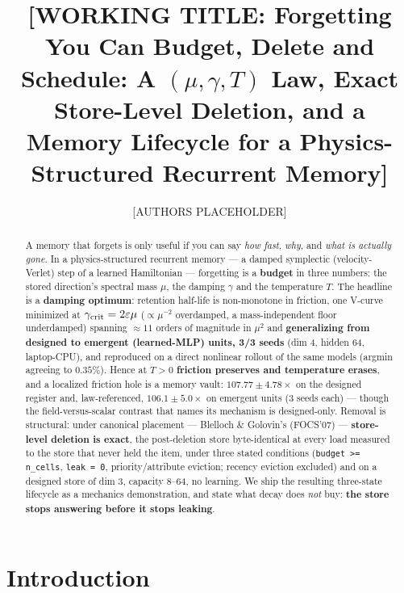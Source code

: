 \documentclass{article}
\title{[WORKING TITLE: Forgetting You Can Budget, Delete and Schedule:
A $(\mu,\gamma,T)$ Law, Exact Store-Level Deletion, and a Memory Lifecycle
for a Physics-Structured Recurrent Memory]}
\author{[AUTHORS PLACEHOLDER]}
\date{}
\begin{document}
\maketitle

\begin{abstract}
A memory that forgets is only useful if you can say \emph{how fast}, \emph{why}, and \emph{what is actually gone}. In a physics-structured recurrent memory --- a damped symplectic (velocity-Verlet) step of a learned Hamiltonian --- forgetting is a \textbf{budget} in three numbers: the stored direction's spectral mass $\mu$, the damping $\gamma$ and the temperature $T$. The headline is a \textbf{damping optimum}: retention half-life is non-monotone in friction, one V-curve minimized at $\gamma_{\rm crit}=2\varepsilon\mu$ ($\propto\mu^{-2}$ overdamped, a mass-independent floor underdamped) spanning $\approx11$ orders of magnitude in $\mu^2$ and \textbf{generalizing from designed to emergent (learned-MLP) units, 3/3 seeds} (dim 4, hidden 64, laptop-CPU), and reproduced on a direct nonlinear rollout of the same models (argmin agreeing to $0.35\%$). Hence at $T>0$ \textbf{friction preserves and temperature erases}, and a localized friction hole is a memory vault: $107.77\pm4.78\times$ on the designed register and, law-referenced, $106.1\pm5.0\times$ on emergent units (3 seeds each) --- though the field-versus-scalar contrast that names its mechanism is designed-only. Removal is structural: under canonical placement --- Blelloch \& Golovin's (FOCS'07) --- \textbf{store-level deletion is exact}, the post-deletion store byte-identical at every load measured to the store that never held the item, under three stated conditions (\texttt{budget >= n\_cells}, \texttt{leak = 0}, priority/attribute eviction; recency eviction excluded) and on a designed store of dim 3, capacity 8--64, no learning. We ship the resulting three-state lifecycle as a mechanics demonstration, and state what decay does \emph{not} buy: \textbf{the store stops answering before it stops leaking}.
\end{abstract}

\section{Introduction}
\end{document}
